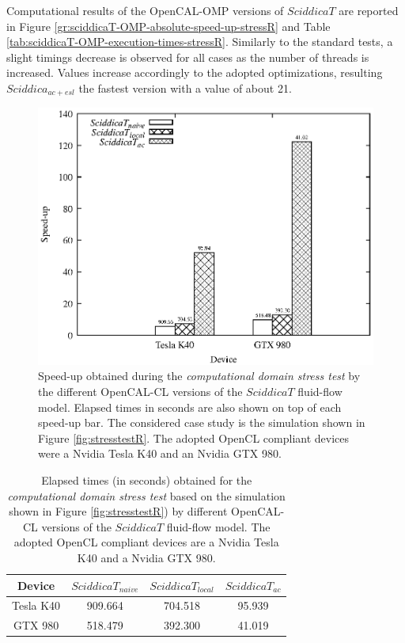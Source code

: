 Computational results of the OpenCAL-OMP versions of $SciddicaT$
are reported in Figure
\ref{gr:sciddicaT-OMP-absolute-speed-up-stressR} and Table \ref{tab:sciddicaT-OMP-execution-times-stressR}. Similarly to the
standard tests, a slight timings decrease is observed for all
cases as the number of threads is increased. Values increase
accordingly to the adopted optimizations, resulting
$Sciddica_{ac+esl}$ the fastest version with a value of about 21.

\begin{figure}
	\begin{center}
		\includegraphics[width=1.0\textwidth]{./images/opencal/Figure13_new}
		\caption{Speed-up obtained during the \emph{computational
				domain stress test} by the different OpenCAL-CL versions
			of the $SciddicaT$ fluid-flow model. Elapsed times in
			seconds are also shown on top of each speed-up bar. The
			considered case study is the simulation shown in Figure
			\ref{fig:stresstestR}. The adopted OpenCL compliant devices
			were a Nvidia Tesla K40 and an Nvidia GTX 980.}
		\label{gr:sciddicaT-CL-absolute-speed-up-stressR}
	\end{center}
\end{figure}
\begin{table}
	\centering
	\begin{tabular}{cccc}
		\hline Device & $SciddicaT_{naive}$ & $SciddicaT_{local}$ &
		$SciddicaT_{ac}$ \\ \hline Tesla K40 & 909.664 & 704.518 &
		95.939\\ GTX 980 & 518.479 & 392.300 & 41.019\\ \hline
	\end{tabular}
	\caption{Elapsed times (in seconds) obtained for the \emph{computational domain stress test} based on the simulation shown in Figure
		\ref{fig:stresstestR}) by different OpenCAL-CL versions of the
		$SciddicaT$ fluid-flow model. The adopted OpenCL compliant devices are
		a Nvidia Tesla K40 and a Nvidia GTX 980.}
	\label{tab:sciddicaT-CL-execution-times-stressR}
\end{table}
